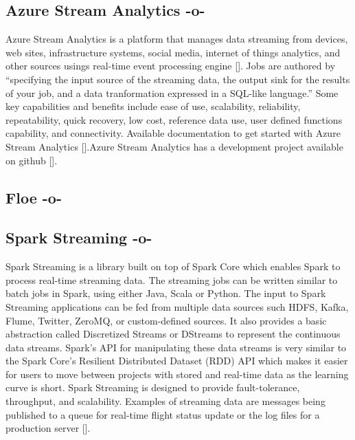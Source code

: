 \subsection{Azure Stream Analytics -o-}

Azure Stream Analytics is a platform that manages data streaming from
devices, web sites, infrastructure systems, social media, internet of
things analytics, and other sources usings real-time event processing
engine [\cite{www-azurestreamanalytics}]. Jobs are authored by
``specifying the input source of the streaming data, the output sink
for the results of your job, and a data tranformation expressed in a
SQL-like language.''  Some key capabilities and benefits include ease
of use, scalability, reliability, repeatability, quick recovery, low
cost, reference data use, user defined functions capability, and
connectivity. Available documentation to get started with Azure Stream
Analytics [\cite{www-docs-microsoft}].Azure Stream Analytics has a
development project available on github [\cite{www-github-azure}].



     
\subsection{Floe -o-}



\subsection{Spark Streaming -o-}

Spark Streaming is a library built on top of Spark Core which enables
Spark to process real-time streaming data. The streaming jobs can be
written similar to batch jobs in Spark, using either Java, Scala or
Python. The input to Spark Streaming applications can be fed from
multiple data sources such HDFS, Kafka, Flume, Twitter, ZeroMQ, or
custom-defined sources. It also provides a basic abstraction called
Discretized Streams or DStreams to represent the continuous data
streams. Spark's API for manipulating these data streams is very
similar to the Spark Core's Resilient Distributed Dataset (RDD) API
which makes it easier for users to move between projects with stored
and real-time data as the learning curve is
short\cite{www-apache-spark-RDD}.  Spark Streaming is designed to
provide fault-tolerance, throughput, and scalability. Examples of
streaming data are messages being published to a queue for real-time
flight status update or the log files for a production
server [\cite{www-apache-spark-stream}].


